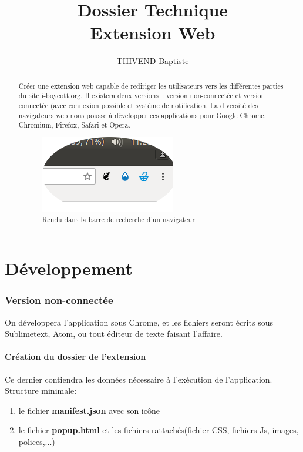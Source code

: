 \documentclass[a4paper,10pt]{report}
\title{Dossier Technique\\ Extension Web}
\author{THIVEND Baptiste}
\begin{document}
\maketitle

\begin{abstract}
 Créer une extension web capable de rediriger les utilisateurs vers les différentes parties du site i-boycott.org. Il existera deux versions : version non-connectée et version connectée (avec connexion possible et système de notification. La diversité des navigateurs web nous pousse à développer ces applications pour Google Chrome, Chromium, Firefox, Safari et Opera.
\begin{figure}[h]
\begin{center}
  \includegraphics{apercu.png}
 \caption{Rendu dans la barre de recherche d'un navigateur}
\end{center}
\end{figure}

 \end{abstract}

\part{Développement}
\section{Version non-connectée}
On développera l'application sous Chrome, et les fichiers seront écrits sous Sublimetext, Atom, ou tout éditeur de texte faisant l'affaire.
\subsection{Création du dossier de l'extension}
Ce dernier contiendra les données nécessaire à l'exécution de l'application.
Structure minimale:

\begin{enumerate}
 \item le fichier \textbf{manifest.json} avec son icône
 \item le fichier \textbf{popup.html} et les fichiers rattachés(fichier CSS, fichiers Js, images, polices,...)
\end{enumerate}
\end{document}
